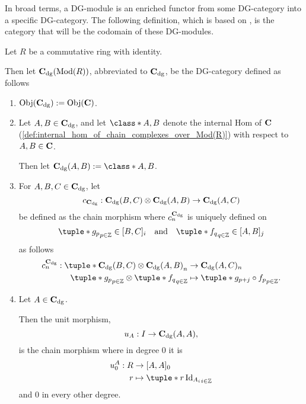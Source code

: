 In broad terms, a DG-module is an enriched functor from some DG-category into a specific DG-category. The following definition, which is based on \cite[p.\ 29]{Jasso-Muro_2023}, is the category that will be the codomain of these DG-modules.

\begin{definition}[\( \C_{\dg} \)]
    \label{def:c_dg_mod_r}
    Let \( R \) be a commutative ring with identity.

    Then let \emph{\( \operatorname{\mathbf{C}}_{\operatorname{dg}}(\operatorname{Mod}(R)) \)}, abbreviated to \emph{\( \C_{\dg} \)}, be the DG-category defined as follows
    \begin{enumerate}
        \item {
            \( \operatorname{Obj}(\operatorname{\mathbf{C}}_{\operatorname{dg}}) := \operatorname{Obj}(\operatorname{\mathbf{C}}) \).
        }
        \item {
            Let \( A, B \in \operatorname{\mathbf{C}}_{\operatorname{dg}} \), and let \( \class*{A, B} \) denote the internal Hom of \( \operatorname{\mathbf{C}} \) (\autoref{def:internal_hom_of_chain_complexes_over_Mod(R)}) with respect to \( A, B \in \operatorname{\mathbf{C}} \).

            Then let \( \C_{\dg}(A, B) := \class*{A, B} \).
        }
        \item {
            For \( A, B, C \in \operatorname{\mathbf{C}}_{\operatorname{dg}} \), let
            \[
                c_{\operatorname{\mathbf{C}}_{\operatorname{dg}}}: \operatorname{\mathbf{C}}_{\operatorname{dg}}(B, C) \otimes \operatorname{\mathbf{C}}_{\operatorname{dg}}(A, B) \to \operatorname{\mathbf{C}}_{\operatorname{dg}}(A, C)
            \]
            be defined as the chain morphism where \( c_n^{\operatorname{\mathbf{C}}_{\operatorname{dg}}} \) is uniquely defined on
            \[
                \tuple*{g_p}_{p \in \Zb} \in [B, C]_i \quad \text{and} \quad \tuple*{f_q}_{q \in \Zb} \in [A, B]_j
            \]
            as follows
            \begin{align*}
                c_n^{\C_{\dg}}: \tuple*{ \C_{\dg}(B, C) \otimes \C_{\dg}(A, B) }_n &\to \C_{\dg}(A, C)_n \\
                \tuple*{g_p}_{p \in \Zb} \otimes \tuple*{f_q}_{q \in \Zb} &\mapsto \tuple*{g_{p + j} \circ f_p}_{p \in \Zb}.
            \end{align*}
        }
        \item {
            Let \( A \in \operatorname{\mathbf{C}}_{\operatorname{dg}} \).

            Then the unit morphism,
            \[
                u_A: I \to \operatorname{\mathbf{C}}_{\operatorname{dg}}(A, A),
            \]
            is the chain morphism where in degree \( 0 \) it is
            \begin{align*}
                u_0^A : R &\to [A, A]_0 \\
                r &\mapsto \tuple*{r\Id_{A_i}}_{i \in \Zb}
            \end{align*}
            and \( 0 \) in every other degree.
        }
    \end{enumerate}
\end{definition}

